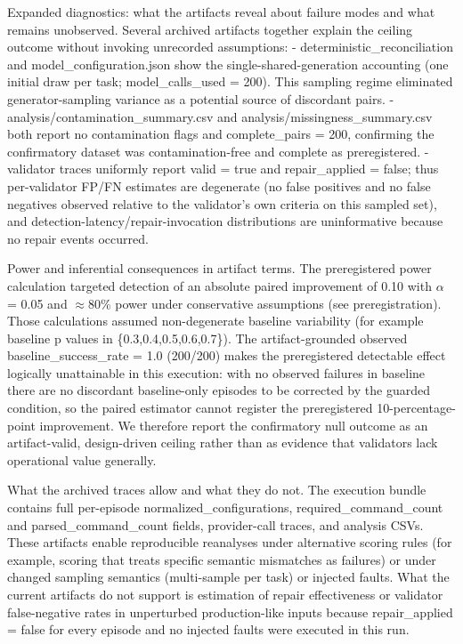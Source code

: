 \documentclass[conference]{IEEEtran}
\begin{document}
Expanded diagnostics: what the artifacts reveal about failure modes and what remains unobserved. Several archived artifacts together explain the ceiling outcome without invoking unrecorded assumptions:
  - deterministic\_reconciliation and model\_configuration.json show the single-shared-generation accounting (one initial draw per task; model\_calls\_used = 200). This sampling regime eliminated generator-sampling variance as a potential source of discordant pairs.
  - analysis/contamination\_summary.csv and analysis/missingness\_summary.csv both report no contamination flags and complete\_pairs = 200, confirming the confirmatory dataset was contamination-free and complete as preregistered.
  - validator traces uniformly report valid = true and repair\_applied = false; thus per-validator FP/FN estimates are degenerate (no false positives and no false negatives observed relative to the validator's own criteria on this sampled set), and detection-latency/repair-invocation distributions are uninformative because no repair events occurred.

Power and inferential consequences in artifact terms. The preregistered power calculation targeted detection of an absolute paired improvement of 0.10 with \ensuremath{\alpha} = 0.05 and \ensuremath{\approx}80\% power under conservative assumptions (see preregistration). Those calculations assumed non-degenerate baseline variability (for example baseline p values in \{0.3,0.4,0.5,0.6,0.7\}). The artifact-grounded observed baseline\_success\_rate = 1.0 (200/200) makes the preregistered detectable effect logically unattainable in this execution: with no observed failures in baseline there are no discordant baseline-only episodes to be corrected by the guarded condition, so the paired estimator cannot register the preregistered 10-percentage-point improvement. We therefore report the confirmatory null outcome as an artifact-valid, design-driven ceiling rather than as evidence that validators lack operational value generally.

What the archived traces allow and what they do not. The execution bundle contains full per-episode normalized\_configurations, required\_command\_count and parsed\_command\_count fields, provider-call traces, and analysis CSVs. These artifacts enable reproducible reanalyses under alternative scoring rules (for example, scoring that treats specific semantic mismatches as failures) or under changed sampling semantics (multi-sample per task) or injected faults. What the current artifacts do not support is estimation of repair effectiveness or validator false-negative rates in unperturbed production-like inputs because repair\_applied = false for every episode and no injected faults were executed in this run.
\end{document}
